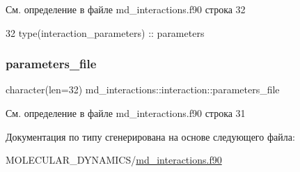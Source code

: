 См. определение в файле md\+\_\+interactions.\+f90 строка 32


\begin{DoxyCode}
32     \textcolor{keywordtype}{type}(interaction\_parameters) :: parameters
\end{DoxyCode}
\mbox{\label{structmd__interactions_1_1interaction_a1ed21689035f3b5b3bae8aec62a081df}} 
\subsubsection{\texorpdfstring{parameters\+\_\+file}{parameters\_file}}
{\footnotesize\ttfamily character(len=32) md\+\_\+interactions\+::interaction\+::parameters\+\_\+file}



См. определение в файле md\+\_\+interactions.\+f90 строка 31



Документация по типу сгенерирована на основе следующего файла\+:\begin{DoxyCompactItemize}
\item 
M\+O\+L\+E\+C\+U\+L\+A\+R\+\_\+\+D\+Y\+N\+A\+M\+I\+C\+S/\mbox{\hyperlink{md__interactions_8f90}{md\+\_\+interactions.\+f90}}\end{DoxyCompactItemize}
